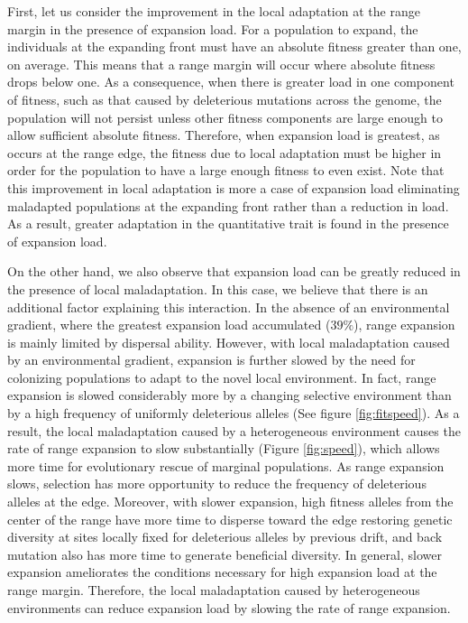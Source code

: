 First, let us consider the improvement in the local adaptation at the range margin in the presence of expansion load. For a population to expand, the individuals at the expanding front must have an absolute fitness greater than one, on average. This means that a range margin will occur where absolute fitness drops below one. As a consequence, when there is greater load in one component of fitness, such as that caused by deleterious mutations across the genome, the population will not persist unless other fitness components are large enough to allow sufficient absolute fitness. Therefore, when expansion load is greatest, as occurs at the range edge, the fitness due to local adaptation must be higher in order for the population to have a large enough fitness to even exist. Note that this improvement in local adaptation is more a case of expansion load eliminating maladapted populations at the expanding front rather than a reduction in load. As a result, greater adaptation in the quantitative trait is found in the presence of expansion load.

On the other hand, we also observe that expansion load can be greatly reduced in the presence of local maladaptation. In this case, we believe that there is an additional factor explaining this interaction.  In the absence of an environmental gradient, where the greatest expansion load accumulated ($39\%$), range expansion is mainly limited by dispersal ability. However, with local maladaptation caused by an environmental gradient, expansion is further slowed by the need for colonizing populations to adapt to the novel local environment. In fact, range expansion is slowed considerably more by a changing selective environment than by a high frequency of uniformly deleterious alleles (See figure \ref{fig:fitspeed}). As a result, the local maladaptation caused by a heterogeneous environment causes the rate of range expansion to slow substantially (Figure \ref{fig:speed}), which allows more time for evolutionary rescue of marginal populations. As range expansion slows, selection has more opportunity to reduce the frequency of deleterious alleles at the edge. Moreover, with slower expansion, high fitness alleles from the center of the range have more time to disperse toward the edge restoring genetic diversity at sites locally fixed for deleterious alleles by previous drift, and back mutation also has more time to generate beneficial diversity. %
In general, slower expansion ameliorates the conditions necessary for high expansion load at the range margin. Therefore, the local maladaptation caused by heterogeneous environments can reduce expansion load by slowing the rate of range expansion.

